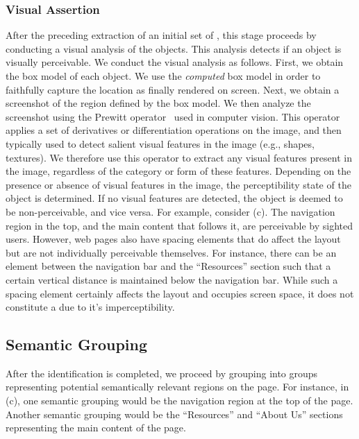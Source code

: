 \subsubsection{Visual Assertion}\label{subsub:vizassert}
After the preceding extraction of an initial set of {\vizobjs}, 
this stage proceeds by conducting a visual analysis of the objects. 
This analysis detects if an object is visually perceivable.
We conduct the visual analysis as follows. First, we obtain the box model of 
each object. We use the \emph{computed} box model in order to faithfully 
capture the location as finally rendered on screen. 
Next, we obtain a screenshot of the region defined by the box model. 
We then analyze the screenshot using the Prewitt operator~\cite{nixon2019feature} 
used in computer vision. This operator applies a set of derivatives or 
differentiation operations on the image, and then typically used to detect 
salient visual features in the image (e.g., shapes, textures). 
We therefore use this operator to extract any visual features present in the image,
regardless of the category or form of these features. 
Depending on the presence or absence of visual features in the image, the perceptibility state of the object is determined.
If no visual features are detected, 
the object is deemed to be non-perceivable, and vice versa. 
For example, consider (c).
The navigation region in the top, and the 
main content that follows it, are perceivable by sighted users. 
However, web pages also have spacing elements that 
do affect the layout but are not individually perceivable themselves. 
For instance, there can be an element between the navigation bar 
and the ``Resources'' section such that a certain vertical distance is 
maintained below the navigation bar. While such a spacing element certainly 
affects the layout and occupies screen space, 
it does not constitute a {\vizobj} due to it's imperceptibility. 

\subsection{Semantic Grouping} \label{sec:grouping}

After the {\vizobjs} identification is completed,
we proceed by grouping {\vizobjs} into groups representing potential
semantically relevant regions on the page. 
For instance, in (c), 
one semantic grouping would be the navigation region 
at the top of the page. 
Another semantic grouping would be the ``Resources'' and ``About Us'' 
sections representing the main content of the page.

